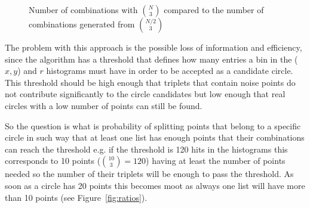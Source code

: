 \documentclass[11pt,twoside]{scrreprt}
\begin{document}
\begin{figure}[b]
\centering
  \caption{Number of combinations with $\binom{N}{3}$ compared to the number of combinations generated from $\binom{N/2}{3}$}
  \label{fig:binom_half_growth}
\end{figure}

The problem with this approach is the possible loss of information and efficiency, since the
algorithm has a threshold that defines how many entries a bin in the ($x,y$) and $r$ histograms must 
have in order to be accepted as a candidate circle.
This threshold should be high enough that triplets that contain noise points
do not contribute significantly to the circle candidates but low enough that real circles with a
low number of points can still be found.

So the question is what is probability of splitting points that belong to a specific circle in such way that at least one list
has enough points that their combinations can reach the threshold e.g. if the threshold is 120 hits in the histograms this corresponds
to 10 points ($\binom{10}{3} = 120$)
having at least the number of points needed so the number of their triplets will be enough
to pass the threshold. As soon as a circle has 20 points this becomes moot as always one list will have more 
than 10 points (see Figure~\ref{fig:ratios}).
\end{document}

